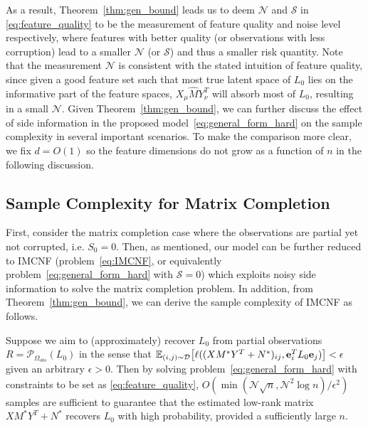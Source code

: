 \documentclass[twoside,11pt]{article}
\def\be{{\bf e}}
\def\Obs{\Omega_{obs}}
\def\dist{{\mathcal D}}
\newcommand\Ex[2]{{\mathbb E}_{#1}\big[#2\big]}
\newcommand\proj[1]{{\mathcal P}_{#1}}
\def\nmax{{\mathcal N}}
\def\smax{{\mathcal S}}
\def\realL{L_0}
\def\realS{S_0}
\def\optM{M^*}
\def\optN{N^*}
\def\optS{S^*}
\begin{document}
As a result, Theorem~\ref{thm:gen_bound}
leads us to deem $\nmax$ and $\smax$ in \eqref{eq:feature_quality} to be the measurement of
feature quality and noise level respectively, where features with
better quality (or observations with less corruption) lead to a smaller $\nmax$ (or $\smax$)
and thus a smaller risk quantity.
Note that the measurement $\nmax$ is consistent with the stated intuition of feature quality,
since given a good feature set such that
most true latent space of $\realL$ lies on the informative part of the feature spaces,
$X_\mu\hat{M}Y_\nu^T$ will absorb most of $\realL$, resulting in a small $\nmax$.
Given Theorem~\ref{thm:gen_bound}, we can further
discuss the effect of side information in the proposed model~\eqref{eq:general_form_hard}
on the sample complexity in several important scenarios.  To make the comparison more clear, we fix $d = O(1)$ so
the feature dimensions do not grow as a function of $n$ in the following discussion.

\subsection{Sample Complexity for Matrix Completion}
\label{subsec:theory.mc}
First, consider the matrix completion case where the observations are partial yet
not corrupted, i.e. $\realS = 0$.  Then, as mentioned, our model can be further reduced to
IMCNF (problem~\eqref{eq:IMCNF}, or equivalently problem~\eqref{eq:general_form_hard} with $\smax = 0$)
which exploits noisy side information to solve the matrix completion
problem.  In addition, from Theorem~\ref{thm:gen_bound},
we can derive the sample complexity of IMCNF as follows.

\begin{corollary} %
Suppose we aim to (approximately) recover $\realL$
from partial observations $R = \proj{\Obs}(\realL)$ in the sense that
$\Ex{(i,j)\sim\dist}{\ell((X\optM Y^T+\optN)_{ij}, \be_i^T\realL\be_j)}< \epsilon$ given an arbitrary $\epsilon > 0$.
Then by solving problem~\eqref{eq:general_form_hard} with constraints
to be set as \eqref{eq:feature_quality},
$O(\min(\nmax\sqrt{n}, \nmax^2\log{n})/\epsilon^2)$ samples are sufficient
to guarantee that the estimated low-rank matrix
$X\optM Y^T+\optN$ recovers $\realL$ with high probability, provided a
sufficiently large $n$.
\label{thm:sample_comp_mc}
\end{corollary}
\end{document}
